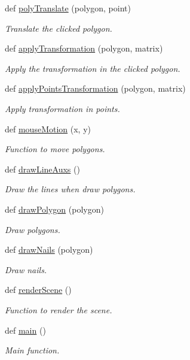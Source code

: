 \begin{DoxyCompactItemize}
def \hyperlink{namespacemain_a848d152d3c07a537f3b10c10da6b9ada}{poly\+Translate} (polygon, point)
\begin{DoxyCompactList}\small\item\em Translate the clicked polygon. \end{DoxyCompactList}\item 
def \hyperlink{namespacemain_af741617d2be459cc13d54e92c1d363ab}{apply\+Transformation} (polygon, matrix)
\begin{DoxyCompactList}\small\item\em Apply the transformation in the clicked polygon. \end{DoxyCompactList}\item 
def \hyperlink{namespacemain_a811bdfecb7d3d33030ecdd071a721cbf}{apply\+Points\+Transformation} (polygon, matrix)
\begin{DoxyCompactList}\small\item\em Apply transformation in points. \end{DoxyCompactList}\item 
def \hyperlink{namespacemain_aac29b4e8c9fa3c64c062e76290492fb8}{mouse\+Motion} (x, y)
\begin{DoxyCompactList}\small\item\em Function to move polygons. \end{DoxyCompactList}\item 
def \hyperlink{namespacemain_a1643f1b77856aad4a75df8da45cb9006}{draw\+Line\+Auxs} ()
\begin{DoxyCompactList}\small\item\em Draw the lines when draw polygons. \end{DoxyCompactList}\item 
def \hyperlink{namespacemain_a923e8cecbed43bf133611a409c40c107}{draw\+Polygon} (polygon)
\begin{DoxyCompactList}\small\item\em Draw polygons. \end{DoxyCompactList}\item 
def \hyperlink{namespacemain_a020b084aad026564a4c7ee5af1ac6b91}{draw\+Nails} (polygon)
\begin{DoxyCompactList}\small\item\em Draw nails. \end{DoxyCompactList}\item 
def \hyperlink{namespacemain_a9258848a9cd7db8568ec88c7846c4768}{render\+Scene} ()
\begin{DoxyCompactList}\small\item\em Function to render the scene. \end{DoxyCompactList}\item 
def \hyperlink{namespacemain_af613cea4cba4fb7de8e40896b3368945}{main} ()
\begin{DoxyCompactList}\small\item\em Main function. \end{DoxyCompactList}\end{DoxyCompactItemize}

